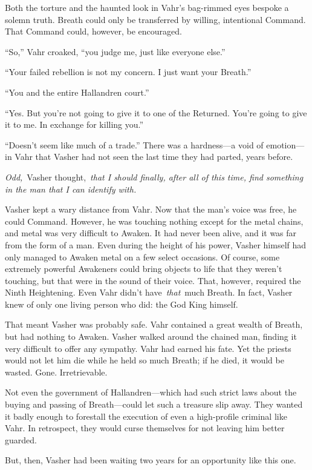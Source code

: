 Both the torture and the haunted look in Vahr’s bag-rimmed eyes bespoke a solemn truth. Breath could only be transferred by willing, intentional Command. That Command could, however, be encouraged.

“So,” Vahr croaked, “you judge me, just like everyone else.”

“Your failed rebellion is not my concern. I just want your Breath.”

“You and the entire Hallandren court.”

“Yes. But you’re not going to give it to one of the Returned. You’re going to give it to me. In exchange for killing you.”

“Doesn’t seem like much of a trade.” There was a hardness—a void of emotion—in Vahr that Vasher had not seen the last time they had parted, years before.

\textit{Odd,}~Vasher thought,~\textit{that I should finally, after all of this time, find something in the man that I can identify with.}

Vasher kept a wary distance from Vahr. Now that the man’s voice was free, he could Command. However, he was touching nothing except for the metal chains, and metal was very difficult to Awaken. It had never been alive, and it was far from the form of a man. Even during the height of his power, Vasher himself had only managed to Awaken metal on a few select occasions. Of course, some extremely powerful Awakeners could bring objects to life that they weren’t touching, but that were in the sound of their voice. That, however, required the Ninth Heightening. Even Vahr didn’t have~\textit{that}~much Breath. In fact, Vasher knew of only one living person who did: the God King himself.

That meant Vasher was probably safe. Vahr contained a great wealth of Breath, but had nothing to Awaken. Vasher walked around the chained man, finding it very difficult to offer any sympathy. Vahr had earned his fate. Yet the priests would not let him die while he held so much Breath; if he died, it would be wasted. Gone. Irretrievable.

Not even the government of Hallandren—which had such strict laws about the buying and passing of Breath—could let such a treasure slip away. They wanted it badly enough to forestall the execution of even a high-profile criminal like Vahr. In retrospect, they would curse themselves for not leaving him better guarded.

But, then, Vasher had been waiting two years for an opportunity like this one.

